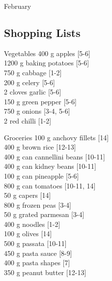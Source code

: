 \begin{menu}{February}
    \subsection*{Shopping Lists}
      \begin{shoppinglist}{Vegetables}
      400 g apples 
        {\scriptsize[5-6]}\\
      1200 g baking potatoes 
        {\scriptsize[5-6]}\\
      750 g cabbage 
        {\scriptsize[1-2]}\\
      200 g celery 
        {\scriptsize[5-6]}\\
      2 cloves garlic 
        {\scriptsize[5-6]}\\
      150 g green pepper 
        {\scriptsize[5-6]}\\
      750 g onions 
        {\scriptsize[3-4, 5-6]}\\
      2  red chilli 
        {\scriptsize[1-2]}\\
      \end{shoppinglist}%
      \begin{shoppinglist}{Groceries}
      100 g anchovy fillets 
        {\scriptsize[14]}\\
      400 g brown rice 
        {\scriptsize[12-13]}\\
      400 g can cannellini beans 
        {\scriptsize[10-11]}\\
      400 g can kidney beans 
        {\scriptsize[10-11]}\\
      100 g can pineapple 
        {\scriptsize[5-6]}\\
      800 g can tomatoes 
        {\scriptsize[10-11, 14]}\\
      50 g capers 
        {\scriptsize[14]}\\
      800 g frozen peas 
        {\scriptsize[3-4]}\\
      50 g grated parmesan 
        {\scriptsize[3-4]}\\
      400 g noodles 
        {\scriptsize[1-2]}\\
      100 g olives 
        {\scriptsize[14]}\\
      500 g passata 
        {\scriptsize[10-11]}\\
      450 g pasta sauce 
        {\scriptsize[8-9]}\\
      400 g pasta shapes 
        {\scriptsize[7]}\\
      350 g peanut butter 
        {\scriptsize[12-13]}\\

\end{shoppinglist}
\end{menu}

